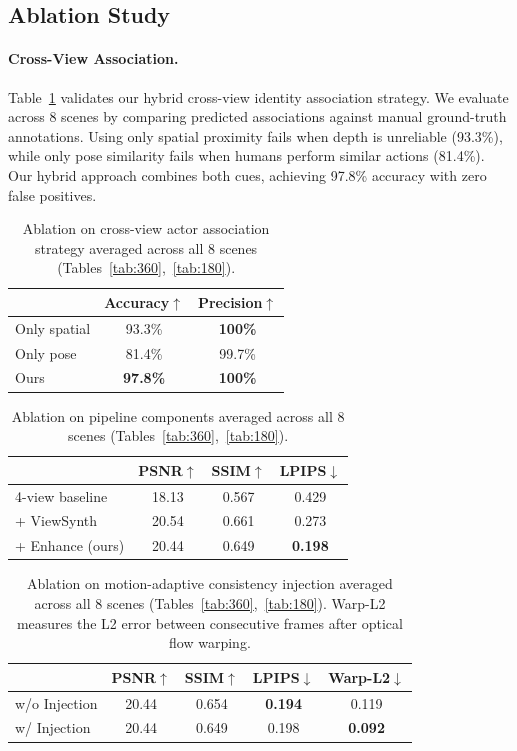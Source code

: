 \documentclass[acmtog]{acmart}
\begin{document}
\subsection{Ablation Study}

\paragraph{Cross-View Association.}
Table~\ref{tab:ablation_association} validates our hybrid cross-view identity association strategy. We evaluate across 8 scenes by comparing predicted associations against manual ground-truth annotations.
Using only spatial proximity fails when depth is unreliable (93.3\%), while only pose similarity fails when humans perform similar actions (81.4\%). Our hybrid approach combines both cues, achieving 97.8\% accuracy with zero false positives.

\begin{table}[t]
\centering
\caption{Ablation on cross-view actor association strategy averaged across all 8 scenes (Tables~\ref{tab:360},~\ref{tab:180}).}
%
\label{tab:ablation_association}
\begin{tabular}{l|cc}
\toprule
& Accuracy$\uparrow$ & Precision$\uparrow$ \\
\midrule
Only spatial & 93.3\% & \textbf{100\%} \\
Only pose & 81.4\% & 99.7\% \\
Ours & \textbf{97.8\%} & \textbf{100\%} \\
\bottomrule
\end{tabular}
\end{table}

\begin{table}[t]
\centering
%
\caption{Ablation on pipeline components averaged across all 8 scenes (Tables~\ref{tab:360},~\ref{tab:180}).}
%
\label{tab:ablation_components}
\begin{tabular}{l|ccc}
\toprule
& PSNR$\uparrow$ & SSIM$\uparrow$ & LPIPS$\downarrow$ \\
\midrule
4-view baseline & 18.13 & 0.567 & 0.429 \\
+ ViewSynth & 20.54 & 0.661 & 0.273 \\
+ Enhance (ours) & 20.44 & 0.649 & \textbf{0.198} \\
\bottomrule
\end{tabular}
\end{table}

\begin{table}[t]
\centering
\caption{Ablation on motion-adaptive consistency injection averaged across all 8 scenes (Tables~\ref{tab:360},~\ref{tab:180}). Warp-L2 measures the L2 error between consecutive frames after optical flow warping.}
%
\label{tab:ablation_inject}
\begin{tabular}{l|cccc}
\toprule
& PSNR$\uparrow$ & SSIM$\uparrow$ & LPIPS$\downarrow$ & Warp-L2$\downarrow$ \\
\midrule
w/o Injection & 20.44 & 0.654 & \textbf{0.194} & 0.119 \\
w/ Injection & 20.44 & 0.649 & 0.198 & \textbf{0.092} \\
\bottomrule
\end{tabular}
\end{table}
\end{document}
